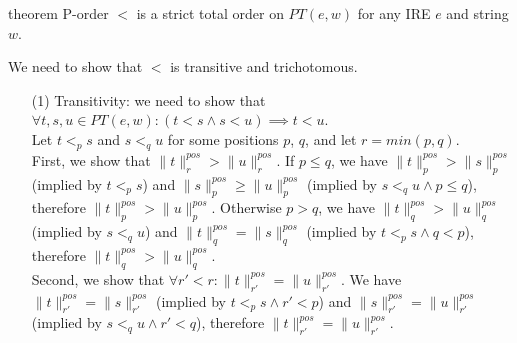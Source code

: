 \documentclass[AMA,STIX1COL]{WileyNJD-v2}
\newcommand{\PT}{PT}
\newcommand{\pnorm}[2]{\|{#1}\|^{pos}_{#2}}
\begin{document}
\begin{theoremEnd}[restate, no link to proof, no link to theorem, category=theorem_porder_on_PTs]{theorem}
    \label{theorem_porder_on_PTs}
    P-order $<$ is a strict total order on $\PT(e, w)$ for any IRE $e$ and string $w$.
\end{theoremEnd}
\begin{proofEnd}
    We need to show that $<$ is transitive and trichotomous.
    \begin{itemize}[itemsep=0.5em, topsep=0.5em]
        \item[(1)]
            Transitivity: we need to show that $\forall t, s, u \in \PT(e,w): (t < s \wedge s < u) \implies t < u$.
            \\[0.5em]
            Let $t <_p s$ and $s <_q u$ for some positions $p$, $q$, and let $r = min (p, q)$.
            \\[0.5em]
            First, we show that $\pnorm{t}{r} > \pnorm{u}{r}$.
            If $p \leq q$, we have $\pnorm{t}{p} > \pnorm{s}{p}$ (implied by $t <_p s$)
            and $\pnorm{s}{p} \geq \pnorm{u}{p}$ (implied by $s <_q u \wedge p \leq q$),
            therefore $\pnorm{t}{p} > \pnorm{u}{p}$.
            Otherwise $p > q$, we have $\pnorm{t}{q} > \pnorm{u}{q}$ (implied by $s <_q u$)
            and $\pnorm{t}{q} = \pnorm{s}{q}$ (implied by $t <_p s \wedge q < p$),
            therefore $\pnorm{t}{q} > \pnorm{u}{q}$.
            \\[0.5em]
            Second, we show that $\forall r' < r : \pnorm{t}{r'} = \pnorm{u}{r'}$.
            We have $\pnorm{t}{r'} = \pnorm{s}{r'}$ (implied by $t <_p s \wedge r' < p$)
            and $\pnorm{s}{r'} = \pnorm{u}{r'}$ (implied by $s <_q u \wedge r' < q$),
            therefore $\pnorm{t}{r'} = \pnorm{u}{r'}$.


\end{itemize}
\end{proofEnd}
\end{document}
